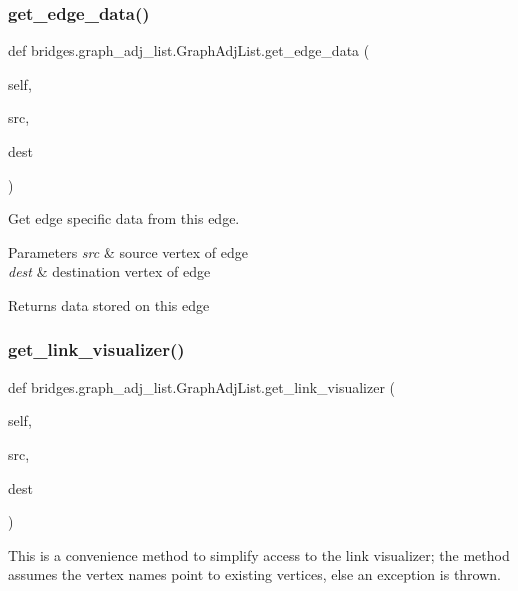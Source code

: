 \subsubsection{\texorpdfstring{get\+\_\+edge\+\_\+data()}{get\_edge\_data()}}
{\footnotesize\ttfamily def bridges.\+graph\+\_\+adj\+\_\+list.\+Graph\+Adj\+List.\+get\+\_\+edge\+\_\+data (\begin{DoxyParamCaption}\item[{}]{self,  }\item[{}]{src,  }\item[{}]{dest }\end{DoxyParamCaption})}



Get edge specific data from this edge. 


\begin{DoxyParams}{Parameters}
{\em src} & source vertex of edge \\
\hline
{\em dest} & destination vertex of edge \\
\hline
\end{DoxyParams}
\begin{DoxyReturn}{Returns}
data stored on this edge 
\end{DoxyReturn}
\mbox{\label{classbridges_1_1graph__adj__list_1_1_graph_adj_list_abaa3015ae78e0f5ebc6fd2d2d2772927}} 
\subsubsection{\texorpdfstring{get\+\_\+link\+\_\+visualizer()}{get\_link\_visualizer()}}
{\footnotesize\ttfamily def bridges.\+graph\+\_\+adj\+\_\+list.\+Graph\+Adj\+List.\+get\+\_\+link\+\_\+visualizer (\begin{DoxyParamCaption}\item[{}]{self,  }\item[{}]{src,  }\item[{}]{dest }\end{DoxyParamCaption})}



This is a convenience method to simplify access to the link visualizer; the method assumes the vertex names point to existing vertices, else an exception is thrown. 


